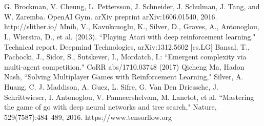 \documentclass[conference]{IEEEtran}
\begin{document}
\section*{}

\begin{thebibliography}{00}
 G. Brockman, V. Cheung, L. Pettersson, J. Schneider, J. Schulman, J. Tang, and W. Zaremba. OpenAI
Gym. arXiv preprint arXiv:1606.01540, 2016.
 http://slither.io/
 Mnih, V., Kavukcuoglu, K., Silver, D., Graves, A., Antonoglou, I., Wierstra, D., et al. (2013). ``Playing Atari with deep reinforcement learning." Technical report. Deepmind Technologies, arXiv:1312.5602 [cs.LG]
 Bansal, T., Pachocki, J., Sidor, S., Sutskever, I., Mordatch, I.: ``Emergent complexity
via multi-agent competition." CoRR abs/1710.03748 (2017)
 Qicheng Ma, Hadon Nash, ``Solving Multiplayer Games with Reinforcement Learning,"
 Silver, A. Huang, C. J. Maddison, A. Guez, L. Sifre, G. Van Den Driessche, J. Schrittwieser, I. Antonoglou, V. Panneershelvam, M. Lanctot, et al. ``Mastering the game of go with deep neural networks and tree search," Nature, 529(7587):484–489, 2016.
https://www.tensorflow.org
\end{thebibliography}
\end{document}
